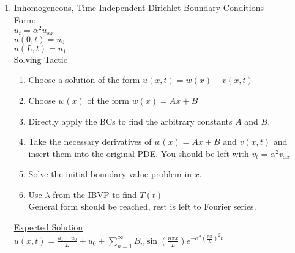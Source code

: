 \documentclass{article}
\begin{document}
\begin{enumerate}
    \item Inhomogeneous, Time Independent Dirichlet Boundary Conditions
    \medskip\\
    \underline{Form:}
    \medskip\\
    $u_t = \alpha^2 u_{xx}$
    \smallskip\\
    $u(0, t) = u_0$\\
    $u(L,t) = u_1$
    \medskip\\
    \underline{Solving Tactic}
    \begin{enumerate}
        \item Choose a solution of the form $u(x,t) = w(x) + v(x,t)$
        \item Choose $w(x)$ of the form $w(x) = Ax + B$
        \item Directly apply the BCs to find the arbitrary constants $A$ and $B$.
        \item Take the necessary derivatives of $w(x) = Ax + B$ and $v(x,t)$ and insert them into the original PDE. You should be left with $v_t = \alpha^2 v_{xx}$
        \item Solve the initial boundary value problem in $x$.
        \item Use $\lambda$ from the IBVP to find $T(t)$
        \medskip\\
        General form should be reached, rest is left to Fourier series.
        \end{enumerate}
    \underline{Expected Solution}
    \medskip\\
    $u(x,t) = \frac{u_1 - u_0}{L} + u_0 + \sum_{n=1}^\infty B_n \sin\left(\frac{n\pi x}{L}\right)e^{-\alpha^2 \left(\frac{n\pi}{L}\right)^2 t}$
    

\end{enumerate}
\end{document}

